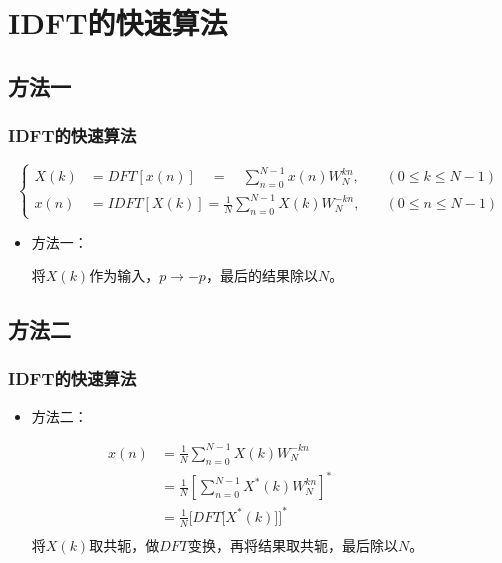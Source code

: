 \documentclass[notheorems,compress,mathserif,table]{beamer}
\begin{document}
\section{IDFT的快速算法}
\subsection{方法一}
\begin{frame}\frametitle{IDFT的快速算法}%
$$
\left \{
\begin{aligned}
    X(k)&= DFT[x(n)]\quad  = \quad\sum_{n=0}^{N-1}x(n)W_{N}^{kn}, &\quad (0\leq k\leq N-1)\\
    x(n)&= IDFT[X(k)] =\frac{1}{N}\sum_{n=0}^{N-1}X(k)W_{N}^{-kn},&\quad (0\leq n\leq N-1)
\end{aligned}
\right.
$$

\begin{itemize}
  \item  方法一： \par

        将$X(k)$作为输入，$p\rightarrow -p$，最后的结果除以$N$。
\end{itemize}
\end{frame}

\subsection{方法二}
\begin{frame}\frametitle{IDFT的快速算法}%
\begin{itemize}
  \item 方法二： \par
        \begin{equation}
        \begin{split}
        x(n)&= \frac{1}{N}\sum_{n=0}^{N-1}X(k)W_{N}^{-kn} \quad\quad\quad\quad\quad\quad\quad\quad\quad\\
            &= \frac{1}{N}\left[\sum_{n=0}^{N-1}X^*(k)W_{N}^{kn} \right]^*\\
            &= \frac{1}{N}\Big[DFT\big[X^*(k)\big]\Big]^*\\
        \end{split}
        \end{equation}
        将$X(k)$取共轭，做$DFT$变换，再将结果取共轭，最后除以$N$。
\end{itemize}

\end{frame}



\end{document}
